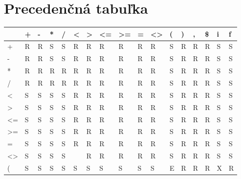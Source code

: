 \documentclass[a4paper]{article}
\begin{document}
\section{Precedenčná tabuľka}
\begin{table}[h]
\centering
\begin{tabular}{|l|l|l|l|l|l|l|l|l|l|l|l|l|l|l|l|l|}
\hline
                      & + & - & * & / & \textless & \textgreater & \textless= & \textgreater= & = & \textless\textgreater & ( & ) & , & \$ & i & f \\ \hline
+                     & R & R & S & S & R         & R            & R          & R             & R & R                     & S & R & R & R & S & S \\ \hline
-                     & R & R & S & S & R         & R            & R          & R             & R & R                     & S & R & R & R & S & S \\ \hline
*                     & R & R & R & R & R         & R            & R          & R             & R & R                     & S & R & R & R & S & S \\ \hline
/                     & R & R & R & R & R         & R            & R          & R             & R & R                     & S & R & R & R & S & S \\ \hline
\textless             & S & S & S & S & R         & R            & R          & R             & R & R                     & S & R & R & R & S & S \\ \hline
\textgreater          & S & S & S & S & R         & R            & R          & R             & R & R                     & S & R & R & R & S & S \\ \hline
\textless=            & S & S & S & S & R         & R            & R          & R             & R & R                     & S & R & R & R & S & S \\ \hline
\textgreater=         & S & S & S & S & R         & R            & R          & R             & R & R                     & S & R & R & R & S & S \\ \hline
=                     & S & S & S & S & R         & R            & R          & R             & R & R                     & S & R & R & R & S & S \\ \hline
\textless\textgreater & S & S & S & S &           & R            & R          & R             & R & R                     & S & R & R & R & S & S \\ \hline
(                     & S & S & S & S & S         & S            & S          & S             & S & S                     & E & R & R & R & X & R \\ \hline

\end{tabular}
\end{table}
\end{document}
